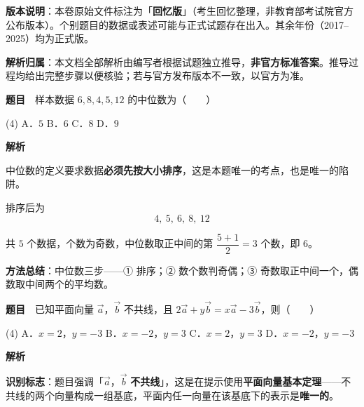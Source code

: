 

\begin{gknotice}
\textbf{版本说明}：本卷原始文件标注为「\textbf{回忆版}」（考生回忆整理，非教育部考试院官方公布版本）。个别题目的数据或表述可能与正式试题存在出入。其余年份（2017–2025）均为正式版。

\textbf{解析归属}：本文档全部解析由编写者根据试题独立推导，\textbf{非官方标准答案}。推导过程均给出完整步骤以便核验；若与官方发布版本不一致，以官方为准。
\end{gknotice}

\par\medskip



\textbf{题目}　样本数据 $6,8,4,5,12$ 的中位数为（　　）

\begin{gkopts}(4)
\task A．$5$
\task B．$6$
\task C．$8$
\task D．$9$
\end{gkopts}

\textbf{解析}

中位数的定义要求数据\textbf{必须先按大小排序}，这是本题唯一的考点，也是唯一的陷阱。

排序后为
\[4,\ 5,\ 6,\ 8,\ 12\]

共 $5$ 个数据，个数为奇数，中位数取正中间的第 $\dfrac{5+1}{2}=3$ 个数，即 $6$。


\begin{gktip}
\textbf{方法总结}：中位数三步——① 排序；② 数个数判奇偶；③ 奇数取正中间一个，偶数取中间两个的平均数。
\end{gktip}

\par\medskip


\textbf{题目}　已知平面向量 $\vec a$，$\vec b$ 不共线，且 $2\vec a+y\vec b=x\vec a-3\vec b$，则（　　）

\begin{gkopts}(4)
\task A．$x=2$，$y=-3$
\task B．$x=-2$，$y=3$
\task C．$x=2$，$y=3$
\task D．$x=-2$，$y=-3$
\end{gkopts}

\textbf{解析}

\textbf{识别标志}：题目强调「$\vec a$，$\vec b$ \textbf{不共线}」，这是在提示使用\textbf{平面向量基本定理}——不共线的两个向量构成一组基底，平面内任一向量在该基底下的表示是\textbf{唯一的}。

